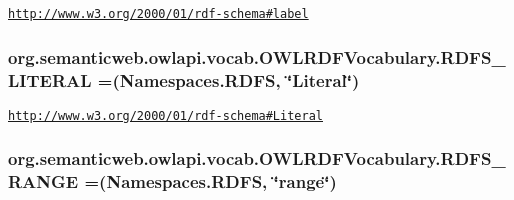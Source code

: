 \href{http://www.w3.org/2000/01/rdf-schema#label}{\tt http\-://www.\-w3.\-org/2000/01/rdf-\/schema\#label} \hypertarget{enumorg_1_1semanticweb_1_1owlapi_1_1vocab_1_1_o_w_l_r_d_f_vocabulary_a760815964ff1d0013e6283c635ae7b54}{
\subsubsection[{R\-D\-F\-S\-\_\-\-L\-I\-T\-E\-R\-A\-L}]{\setlength{\rightskip}{0pt plus 5cm}org.\-semanticweb.\-owlapi.\-vocab.\-O\-W\-L\-R\-D\-F\-Vocabulary.\-R\-D\-F\-S\-\_\-\-L\-I\-T\-E\-R\-A\-L =({\bf Namespaces.\-R\-D\-F\-S}, \char`\"{}Literal\char`\"{})}}\label{enumorg_1_1semanticweb_1_1owlapi_1_1vocab_1_1_o_w_l_r_d_f_vocabulary_a760815964ff1d0013e6283c635ae7b54}
\href{http://www.w3.org/2000/01/rdf-schema#Literal}{\tt http\-://www.\-w3.\-org/2000/01/rdf-\/schema\#\-Literal} \hypertarget{enumorg_1_1semanticweb_1_1owlapi_1_1vocab_1_1_o_w_l_r_d_f_vocabulary_a6c575edfdb9d4a3559f6cc01e4750331}{
\subsubsection[{R\-D\-F\-S\-\_\-\-R\-A\-N\-G\-E}]{\setlength{\rightskip}{0pt plus 5cm}org.\-semanticweb.\-owlapi.\-vocab.\-O\-W\-L\-R\-D\-F\-Vocabulary.\-R\-D\-F\-S\-\_\-\-R\-A\-N\-G\-E =({\bf Namespaces.\-R\-D\-F\-S}, \char`\"{}range\char`\"{})}}\label{enumorg_1_1semanticweb_1_1owlapi_1_1vocab_1_1_o_w_l_r_d_f_vocabulary_a6c575edfdb9d4a3559f6cc01e4750331}
